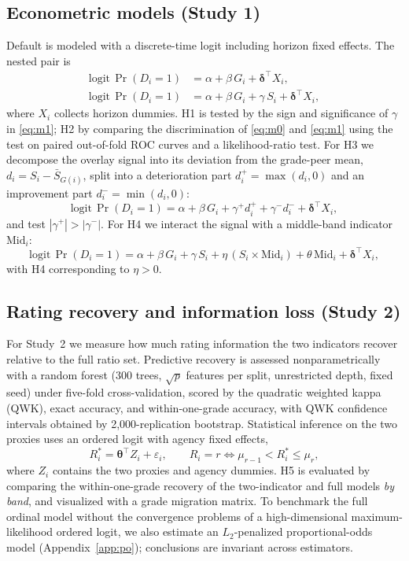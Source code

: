 \documentclass[pdflatex,sn-mathphys-ay]{sn-jnl}
\begin{document}
\subsection{Econometric models (Study 1)}
Default is modeled with a discrete-time logit including horizon fixed effects. The nested pair is
\begin{align}
\text{logit}\,\Pr(D_i=1) &= \alpha + \beta\,G_i + \boldsymbol{\delta}^{\top}X_i, \label{eq:m0}\\
\text{logit}\,\Pr(D_i=1) &= \alpha + \beta\,G_i + \gamma\,S_i + \boldsymbol{\delta}^{\top}X_i, \label{eq:m1}
\end{align}
where $X_i$ collects horizon dummies. H1 is tested by the sign and significance of $\gamma$ in
\eqref{eq:m1}; H2 by comparing the discrimination of \eqref{eq:m0} and \eqref{eq:m1} using the
\citet{delong1988} test on paired out-of-fold ROC curves and a likelihood-ratio test. For H3 we
decompose the overlay signal into its deviation from the grade-peer mean, $d_i = S_i - \bar{S}_{G(i)}$,
split into a deterioration part $d_i^{+}=\max(d_i,0)$ and an improvement part $d_i^{-}=\min(d_i,0)$:
\begin{equation}
\text{logit}\,\Pr(D_i=1) = \alpha + \beta\,G_i + \gamma^{+}d_i^{+} + \gamma^{-}d_i^{-} + \boldsymbol{\delta}^{\top}X_i, \label{eq:h3}
\end{equation}
and test $|\gamma^{+}| > |\gamma^{-}|$. For H4 we interact the signal with a middle-band indicator
$\text{Mid}_i$:
\begin{equation}
\text{logit}\,\Pr(D_i=1) = \alpha + \beta\,G_i + \gamma\,S_i + \eta\,(S_i\times\text{Mid}_i) + \theta\,\text{Mid}_i + \boldsymbol{\delta}^{\top}X_i, \label{eq:h4}
\end{equation}
with H4 corresponding to $\eta>0$.

\subsection{Rating recovery and information loss (Study 2)}
For Study~2 we measure how much rating information the two indicators recover relative to the full
ratio set. Predictive recovery is assessed nonparametrically with a random forest (300 trees, $\sqrt{p}$ features
per split, unrestricted depth, fixed seed) under five-fold cross-validation, scored by the quadratic
weighted kappa (QWK), exact accuracy, and within-one-grade accuracy, with QWK confidence intervals
obtained by 2{,}000-replication bootstrap. Statistical inference on the two proxies uses an ordered logit with agency fixed effects,
\begin{equation}
R_i^{*} = \boldsymbol{\theta}^{\top}Z_i + \varepsilon_i, \qquad R_i = r \iff \mu_{r-1} < R_i^{*} \le \mu_r, \label{eq:ordlogit}
\end{equation}
where $Z_i$ contains the two proxies and agency dummies. H5 is evaluated by comparing the
within-one-grade recovery of the two-indicator and full models \emph{by band}, and visualized with a
grade migration matrix. To benchmark the full ordinal model without the convergence problems of a
high-dimensional maximum-likelihood ordered logit, we also estimate an $L_2$-penalized
proportional-odds model (Appendix~\ref{app:po}); conclusions are invariant across estimators.
\end{document}
